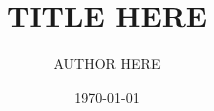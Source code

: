 \documentclass[11pt,a4paper]{article}
\begin{document}
   \title{TITLE HERE}
  \author{AUTHOR HERE}
 \date{\today}
\maketitle


\citet{Ross2018}



\end{document}
